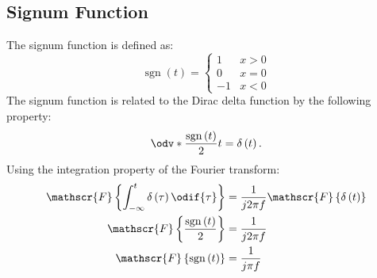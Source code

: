 \documentclass{article}
\DeclareMathOperator{\sgn}{sgn}
\begin{document}
\subsection{Signum Function}
The signum function is defined as:
\begin{equation*}
    \sgn{\left( t \right)} = \begin{cases}
        1  & x > 0 \\
        0  & x = 0 \\
        -1 & x < 0
    \end{cases}
\end{equation*}
The signum function is related to the Dirac delta function by the following property:
\begin{equation*}
    \odv*{\frac{\sgn{\left( t \right)}}{2}}{t} = \delta\left( t \right).
\end{equation*}
Using the integration property of the Fourier transform:
\begin{align*}
    \mathscr{F}\left\{ \int_{-\infty}^t \delta\left( \tau \right) \odif{\tau} \right\} & = \frac{1}{j 2 \pi f} \mathscr{F}\left\{ \delta\left( t \right) \right\} \\
    \mathscr{F}\left\{ \frac{\sgn\left( t \right)}{2} \right\}                         & = \frac{1}{j 2 \pi f}                                                    \\
    \mathscr{F}\left\{ \sgn\left( t \right) \right\}                                   & = \frac{1}{j \pi f}
\end{align*}
\end{document}
